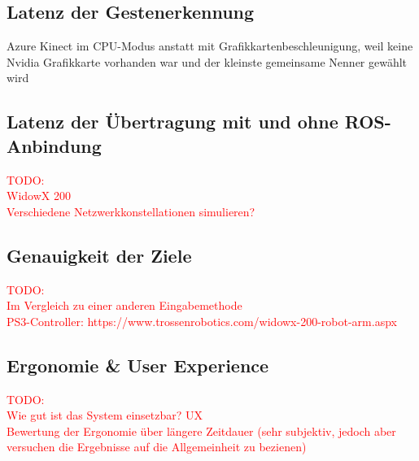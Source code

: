 
\subsection{Latenz der Gestenerkennung}
Azure Kinect im CPU-Modus anstatt mit Grafikkartenbeschleunigung, weil keine Nvidia Grafikkarte vorhanden war und der kleinste gemeinsame Nenner gewählt wird

\subsection{Latenz der Übertragung mit und ohne ROS-Anbindung}
\textcolor{red}{TODO:\\
WidowX 200\\
Verschiedene Netzwerkkonstellationen simulieren? %
}

\subsection{Genauigkeit der Ziele}
\textcolor{red}{TODO:\\
Im Vergleich zu einer anderen Eingabemethode\\
PS3-Controller: https://www.trossenrobotics.com/widowx-200-robot-arm.aspx
}


\subsection{Ergonomie \& User Experience}
\textcolor{red}{TODO:\\
Wie gut ist das System einsetzbar? UX\\
Bewertung der Ergonomie über längere Zeitdauer (sehr subjektiv, jedoch aber versuchen die Ergebnisse auf die Allgemeinheit zu bezienen)
}
